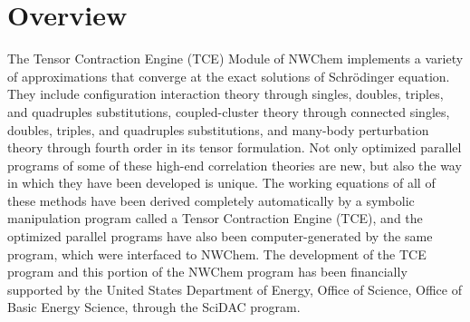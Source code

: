 %
%
\label{sec:tce}

\section{Overview}

The Tensor Contraction Engine (TCE) Module of NWChem implements 
a variety of approximations that converge at the exact solutions
of Schr\"{o}dinger equation.  They include configuration interaction theory
through singles, doubles, triples, and quadruples substitutions,
coupled-cluster theory through connected singles, doubles, triples, and quadruples substitutions,
and many-body perturbation theory through fourth order in its 
tensor formulation.  Not only optimized parallel programs of some
of these high-end correlation theories are new, but also the way in
which they have been developed is unique.  The working equations
of all of these methods have been derived completely automatically by
a symbolic manipulation program called a Tensor Contraction Engine (TCE),
and the optimized parallel programs have also been computer-generated by the same program,
which were interfaced to NWChem.  The development of the TCE
program and this portion of the NWChem program has been financially 
supported by the United States Department of Energy, Office of Science,
Office of Basic Energy Science, through the SciDAC program.

